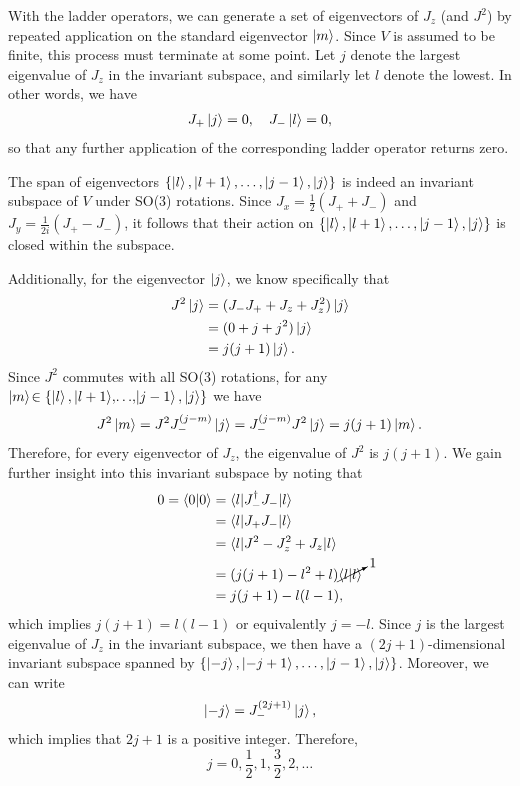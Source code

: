 With the ladder operators, we can generate a set of eigenvectors of $J_z$ (and $J^2$) by repeated application on the standard eigenvector $\ket{m}$. Since $V$ is assumed to be finite, this process must terminate at some point. Let $j$ denote the largest eigenvalue of $J_z$ in the invariant subspace, and similarly let $l$ denote the lowest. In other words, we have
\begin{align*}
    J_+\ket{j} = 0, \quad J_-\ket{l} = 0,
\end{align*}
so that any further application of the corresponding ladder operator returns zero.

The span of eigenvectors $\left\{ \ket{l}, \ket{l+1}, \dots, \ket{j-1}, \ket{j} \right\}$ is indeed an invariant subspace of $V$ under SO(3) rotations. Since $J_x = \frac{1}{2}(J_+ + J_-)$ and $J_y = \frac{1}{2i}(J_+ - J_-)$, it follows that their action on $\left\{ \ket{l}, \ket{l+1}, \dots, \ket{j-1}, \ket{j} \right\}$ is closed within the subspace.

Additionally, for the eigenvector $\ket{j}$, we know specifically that
\begin{align*}
    J^2\ket{j} &= (J_- J_+ + J_z + J_z^2 )\ket{j} \\
    &= (0 + j + j^2)\ket{j} \\
    &= j(j+1)\ket{j}.
\end{align*}
Since $J^2$ commutes with all SO(3) rotations, for any $\ket{m}\!\in\left\{ \ket{l}, \ket{l+1}\!,\! \dots\!,\!\ket{j-1}, \ket{j} \right\}$ we have
\begin{align*}
    J^2\ket{m} = J^2 J_-^{(j-m)}\ket{j} = J_-^{(j-m)} J^2\ket{j} = j(j+1)\ket{m}.
\end{align*}
Therefore, for every eigenvector of $J_z$, the eigenvalue of $J^2$ is $j(j+1)$. We gain further insight into this invariant subspace by noting that
\begin{align}
    0 = \braket{0|0}
        &= \braket{l|J_-^\dagger J_-|l} \nonumber \\
        &= \braket{l|J_+ J_-|l} \nonumber \\
        &= \braket{l|J^2 - J_z^2 + J_z|l} \nonumber \\
        &= (j(j+1) - l^2 + l)\cancelto{1}{\braket{l|l}} \nonumber \\
        &= j(j+1) - l(l-1), \label{eq:ladder_eig}
\end{align}
which implies $j(j+1) = l(l-1)$ or equivalently $j = -l$. Since $j$ is the largest eigenvalue of $J_z$ in the invariant subspace, we then have a $(2j+1)$-dimensional invariant subspace spanned by $\left\{ \ket{-j}, \ket{-j+1}, \dots, \ket{j-1}, \ket{j} \right\}$. Moreover, we can write
\begin{align*}
    \ket{-j} = J_-^{(2j+1)}\ket{j},
\end{align*}
which implies that $2j+1$ is a positive integer. Therefore,
\begin{equation}
    j=0,\frac{1}{2},1,\frac{3}{2},2,\dots
\end{equation}

